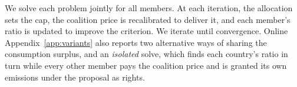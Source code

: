 \documentclass[12pt,english]{article}
\theoremstyle{remark}
\begin{document}
We solve each problem jointly for all members. At each iteration, the allocation sets the cap, the coalition price is recalibrated to deliver it, and each member's ratio is updated to improve the criterion. We iterate until convergence. %
Online Appendix~\ref{app:variants} also reports two alternative ways of sharing the consumption surplus, and an \emph{isolated} solve, which finds each country's ratio in turn while every other member pays the coalition price and is granted its own emissions under the proposal as rights.
\end{document}
